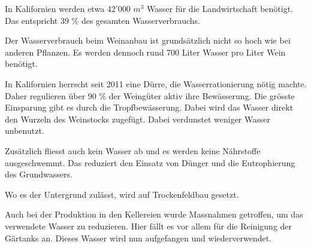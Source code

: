 In Kalifornien werden etwa 42'000 $m^3$ Wasser für die Landwirtschaft benötigt. Das entspricht  39 \% des gesamten
Wasserverbrauchs. 

Der Wasserverbrauch beim Weinanbau ist grundsätzlich nicht so hoch wie bei anderen Pflanzen. Es
werden dennoch rund 700 Liter Wasser pro Liter Wein benötigt.
\cite{_sustainability} 

In Kalifornien
herrscht seit 2011 eine Dürre, die Wasserrationierung nötig machte. Daher regulieren über 90 \% der
Weingüter aktiv ihre Bewässerung. Die grösste Einsparung gibt es durch die Tropfbewässerung. Dabei
wird das Wasser direkt den Wurzeln  des Weinstocks zugefügt. Dabei verdunstet weniger Wasser
unbenutzt.

Zusätzlich fliesst auch kein Wasser ab und es werden keine Nährstoffe ausgeschwemmt. Das reduziert
den Einsatz von Dünger und die Eutrophierung des Grundwassers.

Wo es der Untergrund zulässt, wird auf Trockenfeldbau gesetzt.

\cite{_2015_report_appendix.pdf}


Auch bei der Produktion in den Kellereien wurde Massnahmen getroffen, um das verwendete Wasser zu
reduzieren. Hier fällt es vor allem für die Reinigung der Gärtanks an. Dieses Wasser wird nun
aufgefangen und wiederverwendet.
